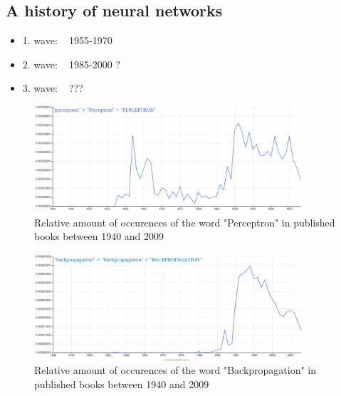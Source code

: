 \begin{appendices}

\chapter{A history of neural networks}

\begin{itemize}
	\item 1. wave: ~ 1955-1970
	\item 2. wave: ~ 1985-2000 \(?\)
	\item 3. wave: ~ ??? 
\end{itemize}

\begin{figure}
	\centering
	\includegraphics[height=150px]{gfx/NGrams_Perceptron.png}
	\caption{Relative amount of occurences of the word "Perceptron" in published books between 1940 and 2009}
\end{figure}

\begin{figure}
	\centering
	\includegraphics[height=150px]{gfx/NGrams_Backpropagation.png}
	\caption{Relative amount of occurences of the word "Backpropagation" in published books between 1940 and 2009}
	\label{fig:NGBackprop}
\end{figure}

\end{appendices}
